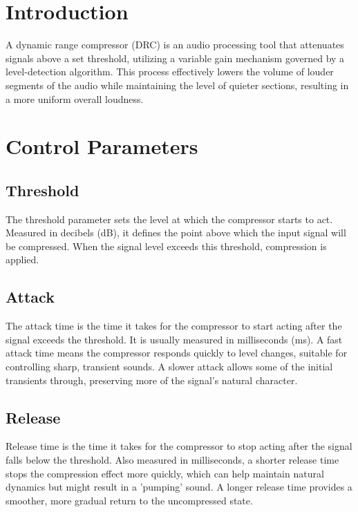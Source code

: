 \documentclass[10pt]{article}
\begin{document}
    \begin{multicols}{2}


        \section{Introduction}
            A dynamic range compressor (DRC) is an audio processing tool that attenuates signals above a set threshold, utilizing a variable gain mechanism governed by a level-detection algorithm. This process effectively lowers the volume of louder segments of the audio while maintaining the level of quieter sections, resulting in a more uniform overall loudness.             

        \section{Control Parameters}
        
            \subsection{Threshold}
                The threshold parameter sets the level at which the compressor starts to act. Measured in decibels (dB), it defines the point above which the input signal will be compressed. When the signal level exceeds this threshold, compression is applied.

            \subsection{Attack}
                The attack time is the time it takes for the compressor to start acting after the signal exceeds the threshold. It is usually measured in milliseconds (ms). A fast attack time means the compressor responds quickly to level changes, suitable for controlling sharp, transient sounds. A slower attack allows some of the initial transients through, preserving more of the signal's natural character.

            \subsection{Release}
                Release time is the time it takes for the compressor to stop acting after the signal falls below the threshold. Also measured in milliseconds, a shorter release time stops the compression effect more quickly, which can help maintain natural dynamics but might result in a 'pumping' sound. A longer release time provides a smoother, more gradual return to the uncompressed state.
                    

\end{multicols}
\end{document}
